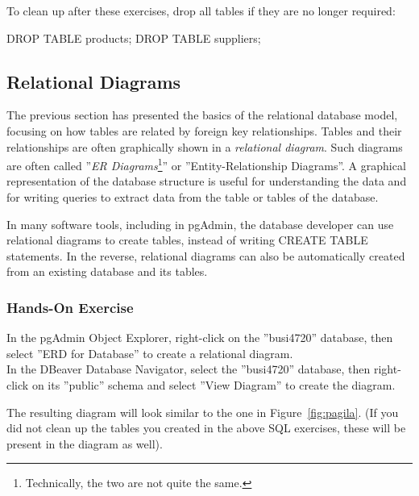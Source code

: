\noindent To clean up after these exercises, drop all tables if they are no longer required:

\begin{samepage}
\begin{sqlcode}
DROP TABLE products;
DROP TABLE suppliers;
\end{sqlcode}
\end{samepage}

\subsection*{Relational Diagrams}

The previous section has presented the basics of the relational database model, focusing on how tables are related by foreign key relationships. Tables and their relationships are often graphically shown in a \emph{relational diagram}. Such diagrams are often called ''\emph{ER Diagrams}\footnote{Technically, the two are not quite the same.}'' or ''Entity-Relationship Diagrams''. A graphical representation of the database structure is useful for understanding the data and for writing queries to extract data from the table or tables of the database. 

In many software tools, including in pgAdmin, the database developer can use relational diagrams to create tables, instead of writing CREATE TABLE statements. In the reverse, relational diagrams can also be automatically created from an existing database and its tables. 

\begin{tcolorbox}[colback=code]
\subsubsection*{Hands-On Exercise}

In the pgAdmin Object Explorer, right-click on the ''busi4720'' database, then select ''ERD for Database'' to create a relational diagram. \\

In the DBeaver Database Navigator, select the ''busi4720'' database, then right-click on its ''public'' schema and select ''View Diagram'' to create the diagram.
\end{tcolorbox}

\noindent The resulting diagram will look similar to the one in Figure~\ref{fig:pagila}. (If you did not clean up the tables you created in the above SQL exercises, these will be present in the diagram as well).

